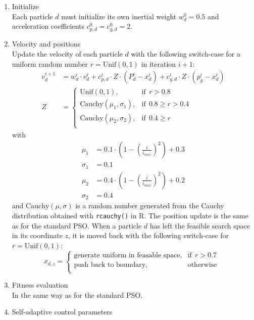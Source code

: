 \documentclass[
  oneside]{book}
\begin{document}
\begin{enumerate}
\def\labelenumi{\arabic{enumi})}
\item
  Initialize\\
  Each particle \(d\) must initialize its own inertial weight \(w_d^0=0.5\) and acceleration coefficients \(c_{p,d}^0 = c_{g,d}^0 = 2\).
\item
  Velocity and positions\\
  Update the velocity of each particle \(d\) with the following switch-case for a uniform random number \(r = \text{Unif}(0,1)\) in iteration \(i+1\):
  \begin{align*}
    v_d^{i+1} &= w_d^i \cdot v_d^{i}+c_{p,d}^i \cdot Z \cdot (P_{d}^i-x_d^i) + c_{g,d}^i \cdot Z \cdot (p_{g}^i-x_d^i) \\
    Z &= \begin{cases}
   \text{Unif}(0,1), & \text{if}\ \ r > 0.8\\
   \text{Cauchy}(\mu_1, \sigma_1), & \text{if}\ \ 0.8 \geq r > 0.4\\
   \text{Cauchy}(\mu_2, \sigma_2), & \text{if}\ \ 0.4 \geq r\\
    \end{cases}
  \end{align*}
  with
  \begin{align*}
    \mu_1 &= 0.1 \cdot (1-(\frac{i}{i_{max}})^2) + 0.3 \\
    \sigma_1 &= 0.1 \\
    \mu_2 &= 0.4 \cdot (1-(\frac{i}{i_{max}})^2) + 0.2 \\
    \sigma_2 &= 0.4
  \end{align*}
  and \(\text{Cauchy}(\mu, \sigma)\) is a random number generated from the Cauchy distribution obtained with \texttt{rcauchy()} in R. The position update is the same as for the standard PSO. When a particle \(d\) has left the feasible search space in its coordinate \(z\), it is moved back with the following switch-case for \(r = \text{Unif}(0,1)\):
  \[
    x_{d,z} = 
    \begin{cases}
   \text{generate uniform in feasable space}, & \text{if}\ \ r > 0.7\\
   \text{push back to boundary}, & \text{otherwise}\ \ \\
    \end{cases}
  \]
\item
  Fitness evaluation\\
  In the same way as for the standard PSO.
\item
  Self-adaptive control parameters\\

\end{enumerate}
\end{document}
